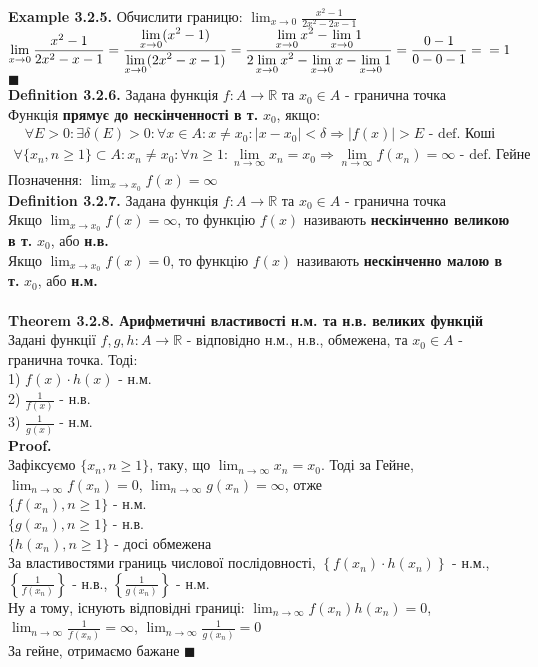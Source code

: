 \documentclass[a4paper, 14pt]{extarticle}
\def\huge{\displaystyle}
\def\bigline{\vspace{5mm}\\}
\def\defin#1{\textbf{Definition {#1}}}
\def\ex#1{\textbf{Example {#1}}}
\def\th#1{\textbf{Theorem {#1}}}
\def\proof{\textbf{Proof.}\\}
\def\bigline{\vspace{5mm}\\}
\def\qed{$\blacksquare$}
\begin{document}
	\ex{3.2.5.} Обчислити границю: $\huge \lim_{x \to 0} \frac{x^2-1}{2x^2-2x-1}$\\
	$\huge \lim_{x \to 0} \frac{x^2-1}{2x^2-x-1} = \frac{\huge \lim_{x \to 0} (x^2-1)}{\huge \lim_{x \to 0}(2x^2-x-1)} = \frac{\huge \lim_{x \to 0}x^2 - \lim_{x \to 0}1}{\huge 2\lim_{x \to 0}x^2 - \lim_{x \to 0}x - \lim_{x \to 0}1} = \frac{0-1}{0-0-1} = \\ = 1$ \qed
	\bigline
	\defin{3.2.6.} Задана функція $f: A \to \mathbb{R}$ та $x_0 \in A$ - гранична точка\\
	Функція \textbf{прямує до нескінченності в т.} $x_0$, якщо:
	\begin{align*}
	\forall E > 0: \exists \delta(E) > 0: \forall x \in A: x \neq x_0: |x-x_0|<\delta \Rightarrow |f(x)|>E \textrm{ - def. Коші}
	\end{align*}
	\begin{align*}
	\forall \{x_n, n \geq 1\}\subset A: x_n \neq x_0: \forall n \geq 1: \lim_{n \to \infty} x_n = x_0 \Rightarrow \lim_{n \to \infty} f(x_n) = \infty \textrm{ - def. Гейне}
	\end{align*}
	Позначення: $\huge \lim_{x \to x_0} f(x) = \infty$\bigline
	\defin{3.2.7.} Задана функція $f: A \to \mathbb{R}$ та $x_0 \in A$ - гранична точка \\
	Якщо $\huge \lim_{x \to x_0} f(x) = \infty$, то функцію $f(x)$ називають \textbf{нескінченно великою в т.} $x_0$, або \textbf{н.в.}\\
	Якщо $\huge \lim_{x \to x_0} f(x) = 0$, то функцію $f(x)$ називають \textbf{нескінченно малою в т.} $x_0$, або \textbf{н.м.}\\
	\bigline
	\th{3.2.8. Арифметичні властивості н.м. та н.в. великих функцій}\\
	Задані функції $f,g,h: A \to \mathbb{R}$ - відповідно н.м., н.в., обмежена, та $x_0 \in A$ - гранична точка. Тоді:\\
	1) $f(x) \cdot h(x)$ - н.м.\\
	2) $\huge \frac{1}{f(x)}$ - н.в.\\
	3) $\huge \frac{1}{g(x)}$ - н.м.\\
	\proof
	Зафіксуємо $\{x_n, n \geq 1\}$, таку, що $\huge \lim_{n \to \infty} x_n = x_0$. Тоді за Гейне, \\ $\huge \lim_{n \to \infty} f(x_n) = 0$, $\huge \lim_{n \to \infty} g(x_n) = \infty$, отже\\
	$\{f(x_n), n \geq 1\}$ - н.м.\\
	$\{g(x_n), n \geq 1\}$ - н.в.\\
	$\{h(x_n), n \geq 1\}$ - досі обмежена\\
	За властивостями границь числової послідовності, $\left\{f(x_n) \cdot h(x_n) \right\}$ - н.м., $\left\{ \huge \frac{1}{f(x_n)} \right\}$ - н.в., $\left\{ \huge \frac{1}{g(x_n)} \right\}$ - н.м.\\
	Ну а тому, існують відповідні границі: $\huge \lim_{n \to \infty} f(x_n) h(x_n) = 0$, \\ $\huge \lim_{n \to \infty} \frac{1}{f(x_n)} = \infty$, $\huge \lim_{n \to \infty} \frac{1}{g(x_n)} = 0$\\
	За гейне, отримаємо бажане \qed
	\bigline
\end{document}
